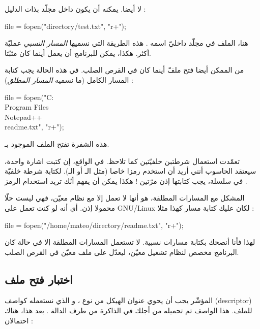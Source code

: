 لا أيضا. يمكنه أن يكون داخل مجلّد بذات الدليل :

\begin{Csource}
  file = fopen("directory/test.txt", "r+");
\end{Csource}

هنا، الملف
في مجلّد  داخليّ اسمه
.
هذه الطريقة التي نسميها
\textit{المسار النسبي}
عمليّة أكثر. هكذا، يمكن للبرنامج أن يعمل أينما كان مثبّتا.

من الممكن أيضا فتح ملفّ أينما كان في القرص الصلب. في هذه الحالة يجب كتابة المسار الكامل (ما نسميه
\textit{المسار المطلق}) :

\begin{Csource}
  file = fopen("C:\\Program Files\\Notepad++\\readme.txt", "r+");
\end{Csource}

هذه الشفرة تفتح الملف
الموجود بـ.

\begin{warning}
  تعمّدت استعمال شرطتبن خلفيّتين
\InlineCode{\textbackslash}
  كما تلاحظ. في الواقع، إن كتبت اشارة واحدة، سيعتقد الحاسوب أنني أريد أن استخدم رمزا خاصا (مثل الـ
أو الـ).
لكتابة شرطة خلفيّة في سلسلة، يجب كتابتها إذن مرّتين ! هكذا يمكن أن يفهم أنّك تريد استخدام الرمز
\InlineCode{\textbackslash}.
\end{warning}

المشكل مع المسارات المطلقة، هو أنها لا تعمل إلا مع نظام معيّن، فهي ليست حلّا محمولا إذن. أي أنه لو كنت تعمل على
\textenglish{GNU/Linux}
لكان عليك كتابة مسار كهذا مثلا :

\begin{Csource}
  file = fopen("/home/mateo/directory/readme.txt", "r+");
\end{Csource}

لهذا فأنا أنصحك بكتابة مسارات نسبية. لا تستعمل المسارات المطلقة إلا في حالة كان البرنامج مخصص لنظام تشغيل معيّن، ليعدّل على ملف معيّن في القرص الصلب.

\subsection{اختبار فتح ملف}
المؤشّر
يجب أن يحوي عنوان الهيكل من نوع
،
و الذي نستعمله كواصف
(\textenglish{descriptor})
للملف. هذا الواصف تم تحميله من أجلك في الذاكرة من طرف الدالة
.
بعد هذا، هناك احتمالان :

